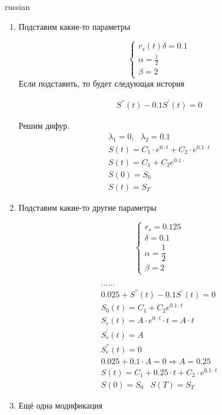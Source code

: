 \documentclass{article}
\begin{document}
\begin{otherlanguage*}{russian}
\begin{enumerate}
\item Подставим какие-то параметры

\begin{equation*}
\begin{cases}
r_s (t) \delta = 0.1 \\ 
\alpha = \frac{1}{2} \\
\beta = 2 
\end{cases}
\end{equation*}
Если подставить, то будет следующая история

\begin{align*}
S^{''} (t) - 0.1 S^{'} (t) = 0 
\end{align*}

Решим дифур. 
\begin{align*}
\lambda_1 = 0, \,\,\,\, \lambda_2 = 0.1 \\
S(t) = C_1 \cdot e ^{0 \cdot t } + C_2 \cdot e ^{0.1 \cdot t} \\
S(t) = C_1 + C_2 e ^{0.1 \cdot } \\
S(0) = S_0 \\
S(t) = S_T  
\end{align*}
\item Подставим какие-то другие параметры 

\begin{equation*}
\begin{cases}
r_s= 0.125 \\
\delta = 0.1 \\
\alpha = \dfrac{1}{2} \\
\beta = 2 
\end{cases}
\end{equation*}

\begin{align*}
\ldots \ldots \\ 
0.025 + S^{''} (t) - 0.1 S^{'} (t) = 0 \\
S_0 (t) = C_1 + C_2 e^{0.1 \cdot t} \\ 
S_r (t) = A \cdot e ^{0 \cdot t} \cdot t = A \cdot t \\ 
S^{'}_r (t) = A \\ 
S^{''}_r (t) = 0 \\
0.025 + 0.1 \cdot A = 0 \Rightarrow A = 0.25 \\
S(t) = C_1 + 0.25 \cdot t + C_2 \cdot e ^{0.1 \cdot t} \\
S(0) = S_0 \,\,\,\,\, S(T) = S_T 
\end{align*}

\item Ещё одна модификация


\end{enumerate}
\end{otherlanguage*}
\end{document}

